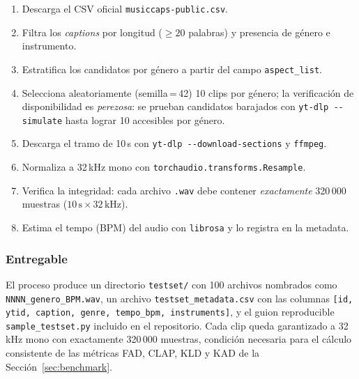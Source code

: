 \begin{enumerate}
  \item Descarga el CSV oficial \texttt{musiccaps-public.csv}.
  \item Filtra los \textit{captions} por longitud ($\geq 20$ palabras) y
        presencia de género e instrumento.
  \item Estratifica los candidatos por género a partir del campo
        \texttt{aspect\_list}.
  \item Selecciona aleatoriamente (semilla\,=\,42) 10 clips por género; la
        verificación de disponibilidad es \emph{perezosa}: se prueban
        candidatos barajados con \texttt{yt-dlp -{}-simulate} hasta lograr 10
        accesibles por género.
  \item Descarga el tramo de 10\,s con
        \texttt{yt-dlp -{}-download-sections} y \texttt{ffmpeg}.
  \item Normaliza a 32\,kHz mono con
        \texttt{torchaudio.transforms.Resample}.
  \item Verifica la integridad: cada archivo \texttt{.wav} debe contener
        \emph{exactamente} 320\,000 muestras ($10\,\text{s} \times
        32\,\text{kHz}$).
  \item Estima el tempo (BPM) del audio con \texttt{librosa} y lo registra en
        la metadata.
\end{enumerate}

\subsubsection{Entregable}

El proceso produce un directorio \texttt{testset/} con 100 archivos nombrados
como \texttt{NNNN\_genero\_BPM.wav}, un archivo \texttt{testset\_metadata.csv}
con las columnas
\texttt{[id, ytid, caption, genre, tempo\_bpm, instruments]}, y el guion
reproducible \texttt{sample\_testset.py} incluido en el repositorio.
Cada clip queda garantizado a 32\,kHz mono con exactamente 320\,000 muestras,
condición necesaria para el cálculo consistente de las métricas FAD, CLAP,
KLD y KAD de la Sección~\ref{sec:benchmark}.

%
%
